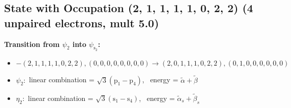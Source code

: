 \documentclass[12pt,a4paper]{article}
\begin{document}
\subsection*{State with Occupation (2, 1, 1, 1, 1, 0, 2, 2) (4 unpaired electrons, mult 5.0)}
        \noindent\textbf{Transition from $\psi_{2}$ into $\psi_{\text{s}_{2}}$:}
        \begin{itemize}
            \item $- (2, 1, 1, 1, 1, 0, 2, 2), (0, 0, 0, 0, 0, 0, 0, 0) \rightarrow (2, 0, 1, 1, 1, 0, 2, 2), (0, 1, 0, 0, 0, 0, 0, 0)$
        
            \item $\psi_{2}:$ linear combination = $\sqrt{3} \left(\text{p}_{1} - \text{p}_{4}\right)$, \
            energy = $\tilde{\alpha} + \tilde{\beta}$
            
            \item $\eta_{2}:$ linear combination = $\sqrt{3} \left(\text{s}_{1} - \text{s}_{4}\right)$, \
            energy = $\tilde{\alpha}_{s} + \tilde{\beta}_{s}$
            

\end{itemize}
\end{document}
